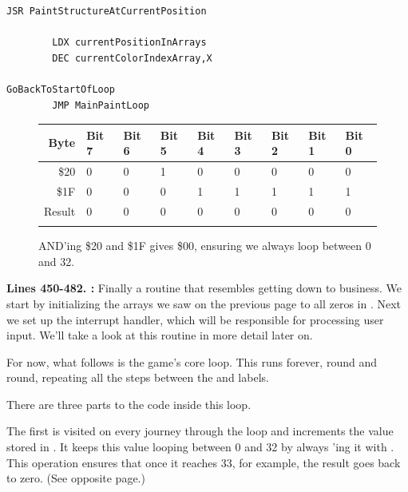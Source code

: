 {\begin{lstlisting}[caption= The game's main loop.]
        JSR PaintStructureAtCurrentPosition

        LDX currentPositionInArrays
        DEC currentColorIndexArray,X

GoBackToStartOfLoop   
        JMP MainPaintLoop

\end{lstlisting}

\begin{figure}[H]
  {
    \setlength{\tabcolsep}{3.0pt}
    \setlength\cmidrulewidth{\heavyrulewidth} %
    \begin{adjustbox}{width=7cm,center}

      \begin{tabular}{rllllllll}
        \toprule
        Byte & Bit 7 & Bit 6 & Bit 5 & Bit 4 & Bit 3 & Bit 2 & Bit 1 & Bit 0        \\
        \midrule
        \$20 & 0 & 0 & 1 & 0 & 0 & 0 & 0 & 0 \\
        \$1F & 0 & 0 & 0 & 1 & 1 & 1 & 1 & 1 \\
        \midrule
        Result & 0 & 0 & 0 & 0 & 0 & 0 & 0 & 0 \\
        \addlinespace
        \bottomrule
      \end{tabular}
    \end{adjustbox}
    }\caption*{AND'ing \$20 and \$1F gives \$00, ensuring we always loop between 0 and 32.}
\end{figure}
\clearpage
{}
\textbf{Lines 450-482. :} Finally a routine that resembles getting down to business. We start by initializing the arrays we saw on the 
previous page to all zeros in . Next we set up the interrupt handler, which will
be responsible for processing user input. We'll take a look at this routine in more detail later on.

For now, what follows is the game's core loop. This runs forever, round and round, repeating all the steps between the
 and  labels. 

There are three parts to the code inside this loop. 

The first is visited on every journey through the loop and increments the
value stored in . It keeps this value looping between 0 and 32 by always 'ing
it with . This  operation ensures that once it reaches 33, for example, the result
goes back to zero. (See opposite page.)

}
